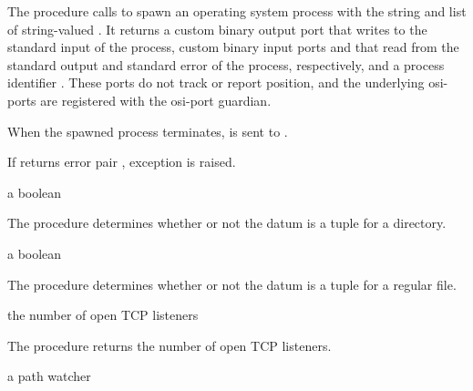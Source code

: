The  procedure calls  to spawn
an operating system process with the string  and list of
string-valued . It returns a custom binary output port
 that writes to the standard input of the process,
custom binary input ports  and  that
read from the standard output and standard error of the process,
respectively, and a process identifier . These ports do
not track or report position, and the underlying osi-ports are
registered with the osi-port guardian.

When the spawned process terminates,  is sent to
.

If  returns error pair , exception  is raised.

\begin{procedure}
\end{procedure}
\returns{} a boolean

The  procedure determines whether or not the
datum  is a  tuple for a directory.

\begin{procedure}
\end{procedure}
\returns{} a boolean

The  procedure determines whether or not the
datum  is a  tuple for a regular file.

\begin{procedure}
\end{procedure}
\returns{} the number of open TCP listeners

The  procedure returns the number of open TCP
listeners.

\begin{procedure}
\end{procedure}
\returns{} a path watcher

